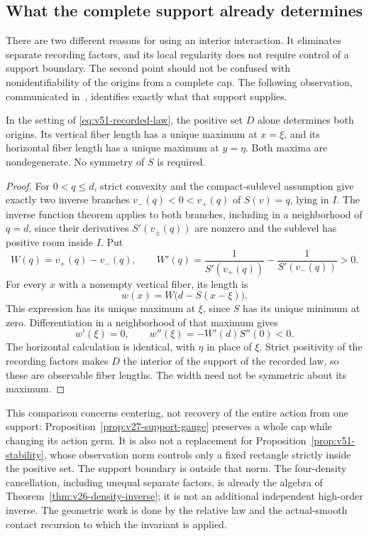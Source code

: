 \subsection{What the complete support already determines}
\label{subsec:v52-support-benchmark}

There are two different reasons for using an interior interaction.  It
eliminates separate recording factors, and its local regularity does not
require control of a support boundary.  The second point should not be
confused with nonidentifiability of the origins from a complete cap.
The following observation, communicated in~\cite{A2ReviewV51}, identifies
exactly what that support supplies.

\begin{lemma}
\label{lem:v52-support-centering}
In the setting of \eqref{eq:v51-recorded-law}, the positive set $D$ alone
determines both origins.  Its vertical fiber length has a unique maximum
at $x=\xi$, and its horizontal fiber length has a unique maximum at
$y=\eta$.  Both maxima are nondegenerate.  No symmetry of $S$ is required.
\end{lemma}

\begin{proof}
For $0<q\le d$, strict convexity and the compact-sublevel assumption give
exactly two inverse branches $v_-(q)<0<v_+(q)$ of $S(v)=q$, lying in
$I$.  The inverse function theorem applies to both branches, including
in a neighborhood of $q=d$, since their derivatives $S'(v_\pm(q))$
are nonzero and the sublevel has positive room inside $I$.  Put
\[
 W(q)=v_+(q)-v_-(q),\qquad
 W'(q)=\frac1{S'(v_+(q))}-\frac1{S'(v_-(q))}>0.
\]
For every $x$ with a nonempty vertical fiber, its length is
\begin{equation}\label{eq:v52-width}
 w(x)=W\bigl(d-S(x-\xi)\bigr).
\end{equation}
This expression has its unique maximum at $\xi$, since $S$ has its
unique minimum at zero.  Differentiation in a neighborhood of that
maximum gives
\[
 w'(\xi)=0,\qquad w''(\xi)=-W'(d)S''(0)<0.
\]
The horizontal calculation is identical, with $\eta$ in place of $\xi$.
Strict positivity of the recording factors makes $D$ the interior of
the support of the recorded law, so these are observable fiber lengths.
The width need not be symmetric about its maximum.
\end{proof}

This comparison concerns centering, not recovery of the entire action
from one support: Proposition~\ref{prop:v27-support-gauge} preserves a
whole cap while changing its action germ.  It is also not a replacement
for Proposition~\ref{prop:v51-stability}, whose observation norm controls
only a fixed rectangle strictly inside the positive set.  The support
boundary is outside that norm.  The four-density cancellation, including
unequal separate factors, is already the algebra of
Theorem~\ref{thm:v26-density-inverse}; it is not an additional independent
high-order inverse.  The geometric work is done by the relative law and
the actual-smooth contact recursion to which the invariant is applied.

